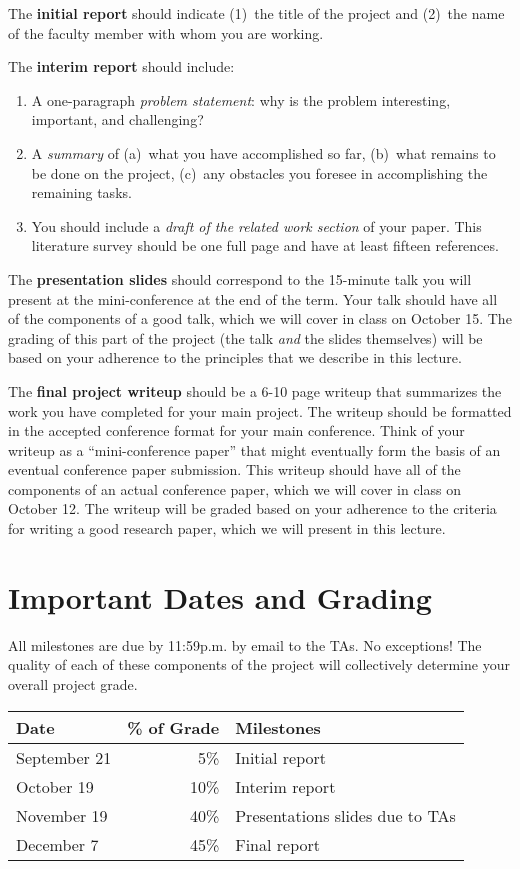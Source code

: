 \documentclass[11pt]{article}
\begin{document}
The {\bf initial report} should indicate (1)~the title of the project and
(2)~the name of the faculty member with whom you are working.

The {\bf interim report} should include:
\begin{enumerate}
\item A one-paragraph {\em problem statement}: why is the problem
  interesting, important, and challenging?
\item A {\em summary} of (a)~what you have accomplished so far, (b)~what
  remains to be done on the project, (c)~any obstacles you foresee in
  accomplishing the remaining tasks.
\item You should include a {\em draft of the related work section} of
  your paper.  This literature survey should be one full page and have
  at least fifteen references.
\end{enumerate}

The {\bf presentation slides} should correspond to the 15-minute talk
you will present at the mini-conference at the end of the term.  Your
talk should have all of the components of a good talk, which we will
cover in class on October 15.  The grading of this part of the project
(the talk {\em and} the slides themselves) will be based on your
adherence to the principles that we describe in this lecture.

The {\bf final project writeup} should be a 6-10 page writeup that
summarizes the work you have completed for your main project.  The
writeup should be formatted in the accepted conference format for your
main conference.  Think of your writeup as a ``mini-conference paper''
that might eventually form the basis of an eventual conference paper
submission.  This writeup should have all of the components of an actual
conference paper, which we will cover in class on October 12.  The
writeup will be graded based on your adherence to the criteria for
writing a good research paper, which we will present in this lecture.

\section{Important Dates and Grading}

All milestones are due by 11:59p.m. by email to the TAs.  No exceptions!
The quality of each of these components of the project will collectively
determine your overall project grade.

\begin{center}
\begin{tabular}{lrp{3.5in}}
{\bf Date} & {\bf \% of Grade} & {\bf Milestones} \\ \hline
September 21 & 5\% & Initial report \\
October 19 & 10\% & Interim report \\
November 19 & 40\% & Presentations slides due to TAs \\
December 7 & 45\% & Final report 
\end{tabular}
\end{center}
\end{document}
